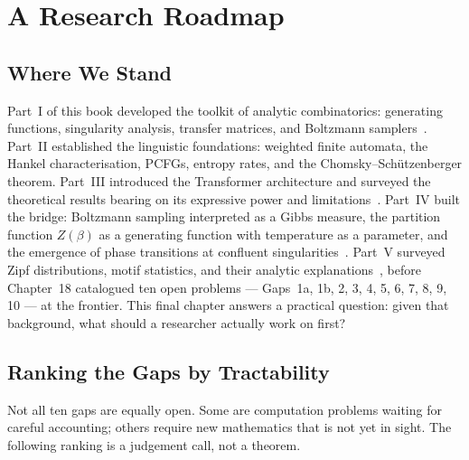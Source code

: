 \chapter{A Research Roadmap}
\label{ch19:top}
\label{ch19}

\section{Where We Stand}
\label{ch19:wherewestand}

Part~I of this book developed the toolkit of analytic combinatorics:
generating functions, singularity analysis, transfer matrices, and
Boltzmann samplers~\cite{FlajoletSedgewick2009}.  Part~II established
the linguistic foundations: weighted finite automata, the Hankel
characterisation, PCFGs, entropy rates, and the Chomsky--Schützenberger
theorem.  Part~III introduced the Transformer architecture and surveyed
the theoretical results bearing on its expressive power and
limitations~\cite{WeissGoldbergYahav2018,MerrillSabharwalSmith2022,RizviEtAl2024}.
Part~IV built the bridge: Boltzmann sampling interpreted as a Gibbs
measure, the partition function $Z(\beta)$ as a generating function
with temperature as a parameter, and the emergence of phase transitions
at confluent singularities~\cite{BanderierKubaWallner2021}.  Part~V
surveyed Zipf distributions, motif statistics, and their analytic
explanations~\cite{Szpankowski2001}, before Chapter~18 catalogued ten
open problems --- Gaps~1a, 1b, 2, 3, 4, 5, 6, 7, 8, 9, 10 --- at the
frontier.  This final chapter answers a practical question: given that
background, what should a researcher actually work on first?

\section{Ranking the Gaps by Tractability}
\label{ch19:ranking}

Not all ten gaps are equally open.  Some are computation problems
waiting for careful accounting; others require new mathematics that is
not yet in sight.  The following ranking is a judgement call, not a
theorem.

